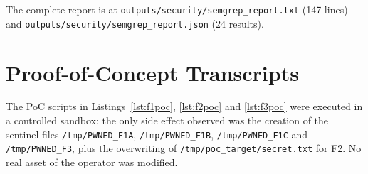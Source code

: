 \documentclass[conference]{IEEEtran}
\begin{document}
The complete report is at
\texttt{outputs/security/semgrep\_report.txt} (147 lines) and
\texttt{outputs/security/semgrep\_report.json} (24 results).

\section{Proof-of-Concept Transcripts}
\label{app:pocs}

The PoC scripts in Listings~\ref{lst:f1poc}, \ref{lst:f2poc} and
\ref{lst:f3poc} were executed in a controlled sandbox; the only side
effect observed was the creation of the sentinel files
\texttt{/tmp/PWNED\_F1A}, \texttt{/tmp/PWNED\_F1B}, \texttt{/tmp/PWNED\_F1C}
and \texttt{/tmp/PWNED\_F3}, plus the overwriting of
\texttt{/tmp/poc\_target/secret.txt} for F2. No real asset of the
operator was modified.
\end{document}
